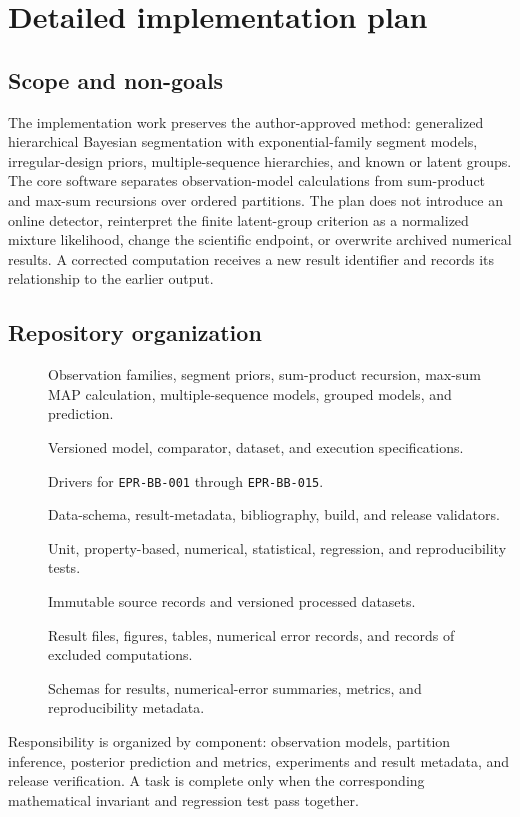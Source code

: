 \chapter{Detailed implementation plan}
\label{app:implementation}
\label{app:code}

\section{Scope and non-goals}
The implementation work preserves the author-approved method: generalized hierarchical Bayesian
segmentation with exponential-family segment models, irregular-design priors, multiple-sequence
hierarchies, and known or latent groups. The core software separates observation-model calculations
from sum-product and max-sum recursions over ordered partitions. The plan does not introduce an
online detector, reinterpret the finite latent-group criterion as a normalized mixture likelihood,
change the scientific endpoint, or overwrite archived numerical results. A corrected computation
receives a new result identifier and records its relationship to the earlier output.

\section{Repository organization}
\begin{description}
\item[] Observation families, segment priors, sum-product recursion, max-sum MAP calculation, multiple-sequence models, grouped models, and prediction.
\item[] Versioned model, comparator, dataset, and execution specifications.
\item[] Drivers for \texttt{EPR-BB-001} through \texttt{EPR-BB-015}.
\item[] Data-schema, result-metadata, bibliography, build, and release validators.
\item[] Unit, property-based, numerical, statistical, regression, and reproducibility tests.
\item[] Immutable source records and versioned processed datasets.
\item[] Result files, figures, tables, numerical error records, and records of excluded computations.
\item[] Schemas for results, numerical-error summaries, metrics, and reproducibility metadata.
\end{description}
Responsibility is organized by component: observation models, partition inference, posterior
prediction and metrics, experiments and result metadata, and release verification. A task is
complete only when the corresponding mathematical invariant and regression test pass together.

